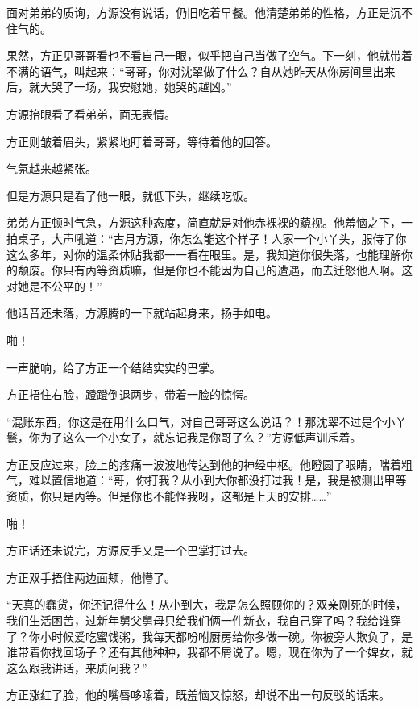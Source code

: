 
\begin{this_body}

面对弟弟的质询，方源没有说话，仍旧吃着早餐。他清楚弟弟的性格，方正是沉不住气的。

果然，方正见哥哥看也不看自己一眼，似乎把自己当做了空气。下一刻，他就带着不满的语气，叫起来：“哥哥，你对沈翠做了什么？自从她昨天从你房间里出来后，就大哭了一场，我安慰她，她哭的越凶。”

方源抬眼看了看弟弟，面无表情。

方正则皱着眉头，紧紧地盯着哥哥，等待着他的回答。

气氛越来越紧张。

但是方源只是看了他一眼，就低下头，继续吃饭。

弟弟方正顿时气急，方源这种态度，简直就是对他赤裸裸的藐视。他羞恼之下，一拍桌子，大声吼道：“古月方源，你怎么能这个样子！人家一个小丫头，服侍了你这么多年，对你的温柔体贴我都一一看在眼里。是，我知道你很失落，也能理解你的颓废。你只有丙等资质嘛，但是你也不能因为自己的遭遇，而去迁怒他人啊。这对她是不公平的！”

他话音还未落，方源腾的一下就站起身来，扬手如电。

啪！

一声脆响，给了方正一个结结实实的巴掌。

方正捂住右脸，蹬蹬倒退两步，带着一脸的惊愕。

“混账东西，你这是在用什么口气，对自己哥哥这么说话？！那沈翠不过是个小丫鬟，你为了这么一个小女子，就忘记我是你哥了么？”方源低声训斥着。

方正反应过来，脸上的疼痛一波波地传达到他的神经中枢。他瞪圆了眼睛，喘着粗气，难以置信地道：“哥，你打我？从小到大你都没打过我！是，我是被测出甲等资质，你只是丙等。但是你也不能怪我呀，这都是上天的安排……”

啪！

方正话还未说完，方源反手又是一个巴掌打过去。

方正双手捂住两边面颊，他懵了。

“天真的蠢货，你还记得什么！从小到大，我是怎么照顾你的？双亲刚死的时候，我们生活困苦，过新年舅父舅母只给我们俩一件新衣，我自己穿了吗？我给谁穿了？你小时候爱吃蜜饯粥，我每天都吩咐厨房给你多做一碗。你被旁人欺负了，是谁带着你找回场子？还有其他种种，我都不屑说了。嗯，现在你为了一个婢女，就这么跟我讲话，来质问我？”

方正涨红了脸，他的嘴唇哆嗦着，既羞恼又惊怒，却说不出一句反驳的话来。


\end{this_body}
